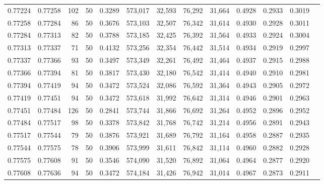\begin{tabular}{rrrrrrrrrrrrr}
0.77224 & 0.77258 &   102 &  50 &                                     0.3289 & 573,017 &  32,593 &  76,292 &  31,664 & 0.4928 & 0.2933 & 0.3019 \\
0.77258 & 0.77284 &    86 &  50 &                                     0.3676 & 573,103 &  32,507 &  76,342 &  31,614 & 0.4930 & 0.2928 & 0.3011 \\
0.77284 & 0.77313 &    82 &  50 &                                     0.3788 & 573,185 &  32,425 &  76,392 &  31,564 & 0.4933 & 0.2924 & 0.3004 \\
0.77313 & 0.77337 &    71 &  50 &                                     0.4132 & 573,256 &  32,354 &  76,442 &  31,514 & 0.4934 & 0.2919 & 0.2997 \\
0.77337 & 0.77366 &    93 &  50 &                                     0.3497 & 573,349 &  32,261 &  76,492 &  31,464 & 0.4937 & 0.2915 & 0.2988 \\
0.77366 & 0.77394 &    81 &  50 &                                     0.3817 & 573,430 &  32,180 &  76,542 &  31,414 & 0.4940 & 0.2910 & 0.2981 \\
0.77394 & 0.77419 &    94 &  50 &                                     0.3472 & 573,524 &  32,086 &  76,592 &  31,364 & 0.4943 & 0.2905 & 0.2972 \\
0.77419 & 0.77451 &    94 &  50 &                                     0.3472 & 573,618 &  31,992 &  76,642 &  31,314 & 0.4946 & 0.2901 & 0.2963 \\
0.77451 & 0.77484 &   126 &  50 &                                     0.2841 & 573,744 &  31,866 &  76,692 &  31,264 & 0.4952 & 0.2896 & 0.2952 \\
0.77484 & 0.77517 &    98 &  50 &                                     0.3378 & 573,842 &  31,768 &  76,742 &  31,214 & 0.4956 & 0.2891 & 0.2943 \\
0.77517 & 0.77544 &    79 &  50 &                                     0.3876 & 573,921 &  31,689 &  76,792 &  31,164 & 0.4958 & 0.2887 & 0.2935 \\
0.77544 & 0.77575 &    78 &  50 &                                     0.3906 & 573,999 &  31,611 &  76,842 &  31,114 & 0.4960 & 0.2882 & 0.2928 \\
0.77575 & 0.77608 &    91 &  50 &                                     0.3546 & 574,090 &  31,520 &  76,892 &  31,064 & 0.4964 & 0.2877 & 0.2920 \\
0.77608 & 0.77636 &    94 &  50 &                                     0.3472 & 574,184 &  31,426 &  76,942 &  31,014 & 0.4967 & 0.2873 & 0.2911 \\

\end{tabular}
